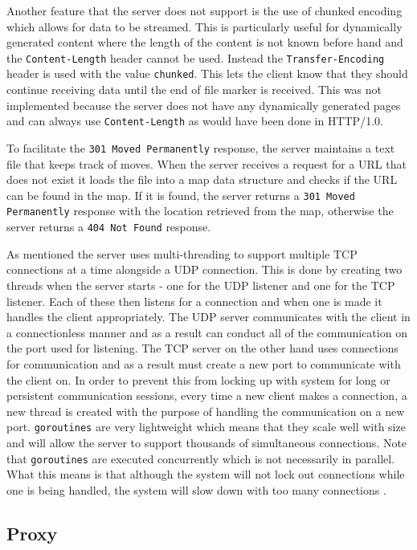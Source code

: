 \documentclass[10pt,twocolumn]{witseiepaper}
\begin{document}
	Another feature that the server does not support is the use of chunked encoding which allows for data to be streamed. This is particularly useful for dynamically generated content where the length of the content is not known before hand and the \texttt{Content-Length} header cannot be used. Instead the \texttt{Transfer-Encoding} header is used with the value \texttt{chunked}. This lets the client know that they should continue receiving data until the end of file marker is received. This was not implemented because the server does not have any dynamically generated pages and can always use \texttt{Content-Length} as would have been done in HTTP/1.0.

	To facilitate the \texttt{301 Moved Permanently} response, the server maintains a text file that keeps track of moves. When the server receives a request for a URL that does not exist it loads the file into a map data structure and checks if the URL can be found in the map. If it is found, the server returns a \texttt{301 Moved Permanently} response with the location retrieved from the map, otherwise the server returns a \texttt{404 Not Found} response.

	As mentioned the server uses multi-threading to support multiple TCP connections at a time alongside a UDP connection. This is done by creating two threads when the server starts - one for the UDP listener and one for the TCP listener. Each of these then listens for a connection and when one is made it handles the client appropriately. The UDP server communicates with the client in a connectionless manner and as a result can conduct all of the communication on the port used for listening. The TCP server on the other hand uses connections for communication and as a result must create a new port to communicate with the client on. In order to prevent this from locking up with system for long or persistent communication sessions, every time a new client makes a connection, a new thread is created with the purpose of handling the communication on a new port. \texttt{goroutines} are very lightweight which means that they scale well with size and will allow the server to support thousands of simultaneous connections. Note that \texttt{goroutines} are executed concurrently which is not necessarily in parallel. What this means is that although the system will not lock out connections while one is being handled, the system will slow down with too many connections \cite{doxsey}.

	\subsection{Proxy}
\end{document}
